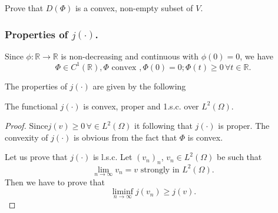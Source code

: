 \begin{exercise}\label{c4:exer2.1}%
Prove that $D (\Phi)$ is a convex, non-empty subset of $V$.
\end{exercise}

\subsubsection{Properties of $j (\cdot)$.}\label{c4:sss2.2.2} 	
Since $\phi : \mathbb{R} \to \mathbb{R}$ is non-decreasing and continuous with $\phi (0) = 0$, we have 
\begin{equation}
\Phi \in C^1 (\mathbb{R}), \Phi \text{ convex }, \Phi (0) = 0; \Phi (t) \geq 0\, \forall t \in \mathbb{R}.\tag{2.12}\label{c4:eq2.12}
\end{equation}

The properties of $j (\cdot)$ are given by the following

\begin{lemma}\label{c4:lem2.1}%
The functional $j (\cdot)$ is convex, proper and 1.s.c. over $L^2(\Omega)$.
\end{lemma}

\begin{proof}
Since\pageoriginale  $j (v) \geq 0\, \forall \in L^2 (\Omega)$ it following that $j (\cdot)$ is proper. The convexity of $j (\cdot)$ is obvious from the  fact that $\Phi$ is convex.

Let us prove that $j (\cdot)$ is l.s.c. Let $(v_n)_n$, $v_n \in L^2 (\Omega)$ be such that
$$
\lim_{n \to \infty} v_n = v \text{ strongly in } L^2 (\Omega).
$$
Then we have to prove that
\begin{equation}
\liminf_{n \to \infty} j (v_n) \geq j (v). \tag{2.13}\label{c4:eq2.13}
\end{equation}
\end{proof}

